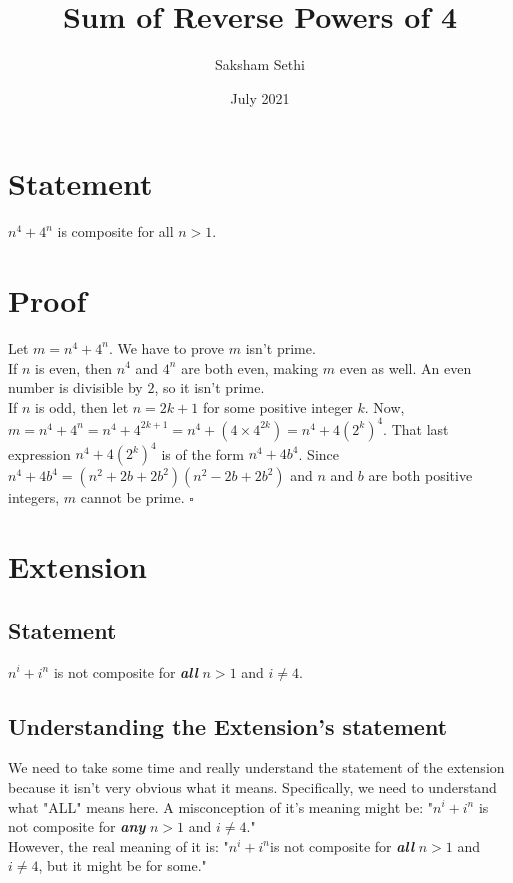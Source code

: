 \documentclass{paper}
\title{Sum of Reverse Powers of 4}
\author{Saksham Sethi}
\date{July 2021}
\begin{document}
\maketitle

\section{Statement}
$n^4 + 4^n$ is composite for all $n>1$. 

\section{Proof}
Let $m=n^4 + 4^n$. We have to prove $m$ isn't prime. \\

If $n$ is even, then $n^4$ and $4^n$ are both even, making $m$ even as well. An even number is divisible by $2$, so it isn't prime. \\

If $n$ is odd, then let $n=2k+1$ for some positive integer $k$. Now, $m=n^4 + 4^n=n^4 + 4^{2k+1}=n^4 + (4\times 4^{2k}) = n^4 + 4(2^k)^4$. That last expression $n^4 + 4(2^k)^4$ is of the form $n^4 + 4b^4$. Since  $n^4 + 4b^4 = (n^2 + 2b + 2b^2)(n^2 - 2b + 2b^2)$ and $n$ and $b$ are both positive integers, $m$ cannot be prime. $\square$\\





\section{Extension}
\subsection{Statement}
$n^i + i^n$ is not composite for \textit{\textbf{all}} $n>1$ and $i \neq 4$.

\subsection{Understanding the Extension's statement }
We need to take some time and really understand the statement of the extension because it isn't very obvious what it means. Specifically, we need to understand what "ALL" means here. A misconception of it's meaning might be: "$n^i + i^n$ is not composite for  \textit{\textbf{any}} $n>1$ and $i \neq 4$." \\

However, the real meaning of it is: "$n^i + i^n$is not composite for \textbf{\textit{all}} $n>1$ and $i \neq 4$, but it might be for some."
\end{document}
